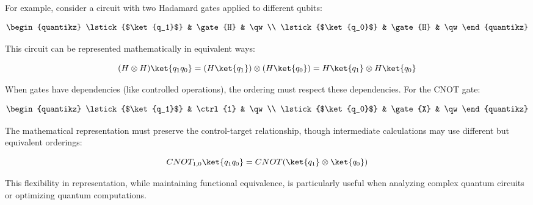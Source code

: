 For example, consider a circuit with two Hadamard gates applied to different
qubits:

\begin{align*}
  \begin{quantikz}
    \lstick{$\ket{q_1}$} & \gate{H} & \qw \\
    \lstick{$\ket{q_0}$} & \gate{H} & \qw
  \end{quantikz}
\end{align*}

This circuit can be represented mathematically in equivalent ways:

\[
  (H \otimes H)\ket{q_1q_0} = (H\ket{q_1}) \otimes (H\ket{q_0}) = H\ket{q_1}
  \otimes H\ket{q_0}
\]

\noindent
When gates have dependencies (like controlled operations), the ordering must
respect these dependencies. For the CNOT gate:

\begin{align*}
  \begin{quantikz}
    \lstick{$\ket{q_1}$} & \ctrl{1} & \qw \\
    \lstick{$\ket{q_0}$} & \gate{X} & \qw
  \end{quantikz}
\end{align*}

\noindent
The mathematical representation must preserve the control-target
relationship, though intermediate calculations may use different but
equivalent orderings:

\[
  CNOT_{1,0}\ket{q_1q_0} = CNOT(\ket{q_1} \otimes \ket{q_0})
\]

This flexibility in representation, while maintaining functional equivalence,
is particularly useful when analyzing complex quantum circuits or optimizing
quantum computations.
